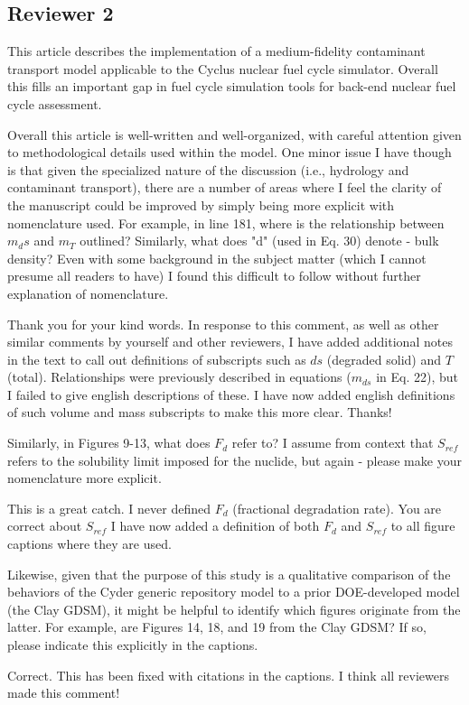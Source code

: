 \documentclass[answers,12pt]{exam}
\begin{document}
\begin{questions}
\section*{Reviewer 2}

\question This article describes the implementation of a medium-fidelity 
contaminant transport model applicable to the Cyclus nuclear fuel cycle 
simulator. Overall this fills an important gap in fuel cycle simulation tools 
for back-end nuclear fuel cycle assessment.

Overall this article is well-written and well-organized, with careful attention 
given to methodological details used within the model. One minor issue I have 
though is that given the specialized nature of the discussion (i.e., hydrology 
and contaminant transport), there are a number of areas where I feel the 
clarity of the manuscript could be improved by simply being more explicit with 
nomenclature used. For example, in line 181, where is the relationship between 
$m_ds$ and $m_T$ outlined? Similarly, what does "d" (used in Eq. 30) denote - 
bulk density? Even with some background in the subject matter (which I cannot 
presume all readers to have) I found this difficult to follow without further 
explanation of nomenclature.
\begin{solution}
Thank you for your kind words. In response to this comment, as well as other 
        similar comments by yourself and other reviewers, I have added 
        additional notes in the text to call out  definitions of subscripts 
        such as $ds$ (degraded solid) and $T$ (total). Relationships were 
        previously described in equations ($m_{ds}$ in Eq. 22), but I failed to 
give english descriptions of these. I have now added english definitions of 
such volume and mass subscripts to make this more clear. Thanks!  
\end{solution}

\question Similarly, in Figures 9-13, what does $F_d$ refer to? I assume from 
context that $S_{ref}$ refers to the solubility limit imposed for the nuclide, 
but again - please make your nomenclature more explicit.  \begin{solution}
        This is a great catch. I never defined $F_d$ (fractional degradation 
rate). You are correct about $S_{ref}$ I have now added a definition of both 
$F_d$ and $S_{ref}$ to all figure captions where they are used.  \end{solution}

\question Likewise, given that the purpose of this study is a qualitative 
comparison of the behaviors of the Cyder generic repository model to a prior 
DOE-developed model (the Clay GDSM), it might be helpful to identify which 
figures originate from the latter. For example, are Figures 14, 18, and 19 from 
the Clay GDSM? If so, please indicate this explicitly in the captions.  
\begin{solution}
Correct. This has been fixed with citations in the captions. I think all 
reviewers made this comment!  \end{solution}


\end{questions}
\end{document}
